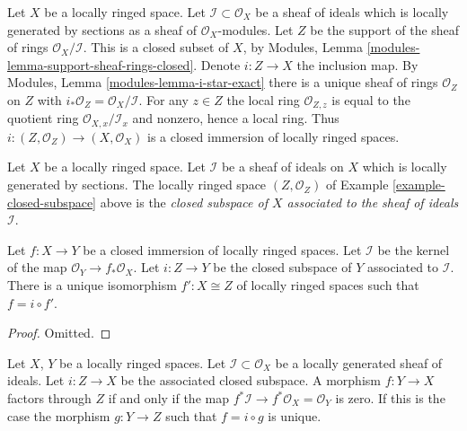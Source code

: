 \begin{example}
\label{example-closed-subspace}
Let $X$ be a locally ringed space.
Let $\mathcal{I} \subset \mathcal{O}_X$ be a sheaf
of ideals which is locally generated by sections as a sheaf
of $\mathcal{O}_X$-modules. Let $Z$ be the support of
the sheaf of rings $\mathcal{O}_X/\mathcal{I}$.
This is a closed subset of $X$, by
Modules, Lemma \ref{modules-lemma-support-sheaf-rings-closed}.
Denote $i : Z \to X$ the inclusion map.
By Modules, Lemma \ref{modules-lemma-i-star-exact}
there is a unique sheaf of rings $\mathcal{O}_Z$ on $Z$
with $i_*\mathcal{O}_Z = \mathcal{O}_X/\mathcal{I}$.
For any $z \in Z$ the local ring $\mathcal{O}_{Z, z}$
is equal to the quotient ring $\mathcal{O}_{X, x}/\mathcal{I}_x$
and nonzero, hence a local ring.
Thus $i : (Z, \mathcal{O}_Z) \to (X, \mathcal{O}_X)$ is
a closed immersion of locally ringed spaces.
\end{example}

\begin{definition}
\label{definition-closed-subspace}
Let $X$ be a locally ringed space.
Let $\mathcal{I}$ be a sheaf of ideals on $X$
which is locally generated by sections.
The locally ringed space $(Z, \mathcal{O}_Z)$
of Example \ref{example-closed-subspace} above
is the {\it closed subspace of $X$ associated to
the sheaf of ideals $\mathcal{I}$}.
\end{definition}

\begin{lemma}
\label{lemma-closed-immersion}
Let $f : X \to Y$ be a closed immersion of
locally ringed spaces. Let $\mathcal{I}$ be the
kernel of the map $\mathcal{O}_Y \to f_*\mathcal{O}_X$.
Let $i : Z \to Y$ be the closed subspace of $Y$
associated to $\mathcal{I}$.
There is a unique isomorphism $f' : X \cong Z$ of
locally ringed spaces such that $f = i \circ f'$.
\end{lemma}

\begin{proof}
Omitted.
\end{proof}

\begin{lemma}
\label{lemma-characterize-closed-subspace}
Let $X$, $Y$ be a locally ringed spaces.
Let $\mathcal{I} \subset \mathcal{O}_X$ be a locally
generated sheaf of ideals.
Let $i : Z \to X$ be the associated closed subspace.
A morphism $f : Y \to X$ factors through $Z$ if
and only if the map
$f^*\mathcal{I} \to f^*\mathcal{O}_X = \mathcal{O}_Y$
is zero. If this is the case the morphism $g : Y \to Z$
such that $f = i \circ g$ is unique.
\end{lemma}

